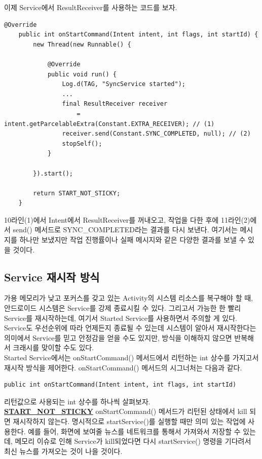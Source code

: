 이제 Service에서 ResultReceiver를 사용하는 코드를 보자.
\begin{lstlisting}[frame=single]
	@Override
	public int onStartCommand(Intent intent, int flags, int startId) {
   		new Thread(new Runnable() {
      
      		@Override
     		public void run() {
         		Log.d(TAG, "SyncService started");
         		...
         		final ResultReceiver receiver 
         			= intent.getParcelableExtra(Constant.EXTRA_RECEIVER); // (1)
         		receiver.send(Constant.SYNC_COMPLETED, null); // (2)
         		stopSelf();
     		}

   		}).start();
   
   		return START_NOT_STICKY;
	}
\end{lstlisting}	
10라인(1)에서 Intent에서 ResultReceiver를 꺼내오고, 작업을 다한 후에 11라인(2)에서 send() 메서드로 SYNC\_COMPLETED라는 결과를 다시 보낸다. 여기서는 메시지를 하나만 보냈지만 작업 진행률이나 실패 메시지와 같은 다양한 결과를 보낼 수 있을 것이다.

\subsection{Service 재시작 방식}
가용 메모리가 낮고 포커스를 갖고 있는 Activity의 시스템 리소스를 복구해야 할 때, 안드로이드 시스템은 Service를 강제 종료시킬 수 있다. 
그리고서 가능한 한 빨리 Service를 재시작하는데, 여기서 Started Service를 사용하면서 주의할 게 있다.
Service도 우선순위에 따라 언제든지 종료될 수 있는데 시스템이 알아서 재시작한다는 의미에서 Service를 믿고 안정감을 얻을 수도 있지만, 방식을 이해하지 않으면 반복해서 크래시를 맞이할 수도 있다.\\

Started Service에서는 onStartCommand() 메서드에서 리턴하는 int 상수를 가지고서 재시작 방식을 제어한다. onStartCommand() 메서드의 시그너처는 다음과 같다.
\begin{lstlisting}[frame=single]
public int onStartCommand(Intent intent, int flags, int startId)
\end{lstlisting}

리턴값으로 사용되는 int 상수를 하나씩 살펴보자.\\
\underline{\bfseries START\_NOT\_STICKY} onStartCommand() 메서드가 리턴된 상태에서 kill 되면 재시작하지 않는다. 명시적으로 startService()를 실행할 때만 의미 있는 작업에 사용한다.
예를 들어, 화면에 보여줄 뉴스를 네트워크를 통해서 가져와서 저장할 수 있는데, 메모리 이슈로 인해 Service가 kill되었다면 다시 startService() 명령을 기다려서 최신 뉴스를 가져오는 것이 나을 것이다.\\

